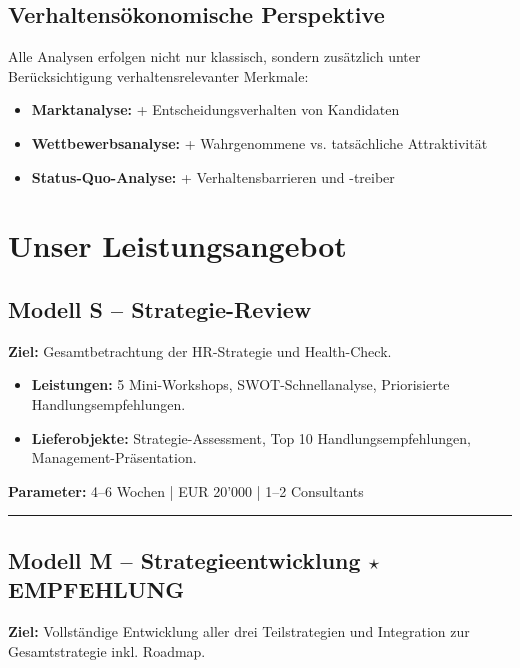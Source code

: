 \documentclass[11pt,a4paper]{article}
\begin{document}
\subsection{Verhaltensökonomische Perspektive}

Alle Analysen erfolgen nicht nur klassisch, sondern zusätzlich unter Berücksichtigung verhaltensrelevanter Merkmale:
\begin{itemize}
    \item \textbf{Marktanalyse:} + Entscheidungsverhalten von Kandidaten
    \item \textbf{Wettbewerbsanalyse:} + Wahrgenommene vs. tatsächliche Attraktivität
    \item \textbf{Status-Quo-Analyse:} + Verhaltensbarrieren und -treiber
\end{itemize}

\newpage

\section{Unser Leistungsangebot}

\subsection{Modell S -- Strategie-Review}

\textbf{Ziel:} Gesamtbetrachtung der HR-Strategie und Health-Check.

\begin{itemize}
    \item \textbf{Leistungen:} 5 Mini-Workshops, SWOT-Schnellanalyse, Priorisierte Handlungsempfehlungen.
    \item \textbf{Lieferobjekte:} Strategie-Assessment, Top 10 Handlungsempfehlungen, Management-Präsentation.
\end{itemize}

\textbf{Parameter:} 4--6 Wochen | EUR 20'000 | 1--2 Consultants

\vspace{5mm}
\hrule
\vspace{5mm}

\begin{recbox}
\subsection{Modell M -- Strategieentwicklung $\star$ EMPFEHLUNG}

\textbf{Ziel:} Vollständige Entwicklung aller drei Teilstrategien und Integration zur Gesamtstrategie inkl. Roadmap.
\end{recbox}
\end{document}

